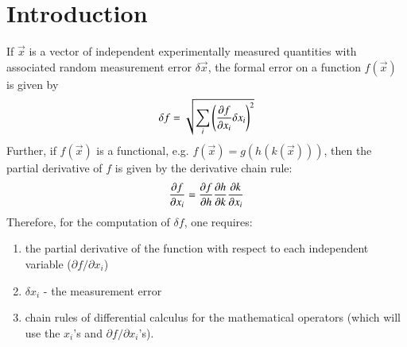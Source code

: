 \documentclass[12pt]{article}
\begin{document}
            
            
            
            

\section{Introduction}

If $\vec x$ is a vector of independent experimentally measured
quantities with associated random measurement error $\delta \vec
x$, the formal error on a function $f(\vec x)$ is given by
\begin{equation}
  \delta f = \sqrt{\sum_i {\left( {\partial f \over {\partial x_i}} 
        \delta x_i \right)}^2}
\label{FERR}
\end{equation}
Further, if $f(\vec x)$ is a functional, e.g. $f(\vec x)=g(h(k(\vec
x)))$, then the partial derivative of $f$ is given by the derivative
chain rule:
\begin{equation}
{\partial f \over \partial x_i} = {\partial f \over \partial h} 
{\partial h \over \partial k} {\partial k \over \partial x_i}
\label{DFUNCTIONAL}
\end{equation}
Therefore, for the computation of $\delta f$, one requires:
\begin{enumerate}
\item the partial derivative of the function with respect to each
independent variable ($\partial f / \partial x_i$)
\item $\delta x_i$ - the measurement error
\item chain rules of differential calculus for the
mathematical operators (which will use the $x_i$'s and $\partial f /
\partial x_i$'s).  
\end{enumerate}
\end{document}
